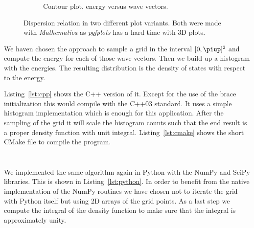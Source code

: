 \documentclass[11pt, english, fleqn, DIV=15, headinclude, BCOR=1cm]{scrartcl}
\begin{document}
\begin{figure}
\begin{subfigure}[c]{0.48\linewidth}
        \caption{%
            Contour plot, energy versus wave vectors.
        }
        \label{fig:dispersion/2}
    \end{subfigure}
    \caption{%
        Dispersion relation in two different plot variants. Both were made with
        \emph{Mathematica} as \emph{pgfplots} has a hard time with 3D plots.
    }
    \label{fig:dispersion}
\end{figure}

We haven chosen the approach to sample a grid in the interval $[0, \piup]^2$
and compute the energy for each of those wave vectors. Then we build up a
histogram with the energies. The resulting distribution is the density of
states with respect to the energy.

Listing~\ref{lst:cpp} shows the C++ version of it. Except for the use of the
brace initialization this would compile with the C++03 standard. It uses a
simple histogram implementation which is enough for this application. After the
sampling of the grid it will scale the histogram counts such that the end
result is a proper density function with unit integral. Listing~\ref{lst:cmake}
shows the short CMake file to compile the program.

\begin{listing}[tb]
    \inputminted[linenos, fontsize=\footnotesize]{cpp}{dos.cpp}
    \caption{%
        C++ program for density of state computation.
    }
    \label{lst:cpp}
\end{listing}

\begin{listing}[tb]
    \inputminted[linenos, fontsize=\footnotesize]{cmake}{CMakeLists.txt}
    \caption{%
        CMake build file for C++ program.
    }
    \label{lst:cmake}
\end{listing}

We implemented the same algorithm again in Python with the NumPy and SciPy
libraries. This is shown in Listing~\ref{lst:python}. In order to benefit from
the native implementation of the NumPy routines we have chosen not to iterate
the grid with Python itself but using 2D arrays of the grid points. As a last
step we compute the integral of the density function to make sure that the
integral is approximately unity.

\begin{listing}[tb]
    \inputminted[linenos, fontsize=\footnotesize]{python}{dos.py}
    \caption{%
        Python program for density of state computation.
    }
    \label{lst:python}
\end{listing}
\end{document}
